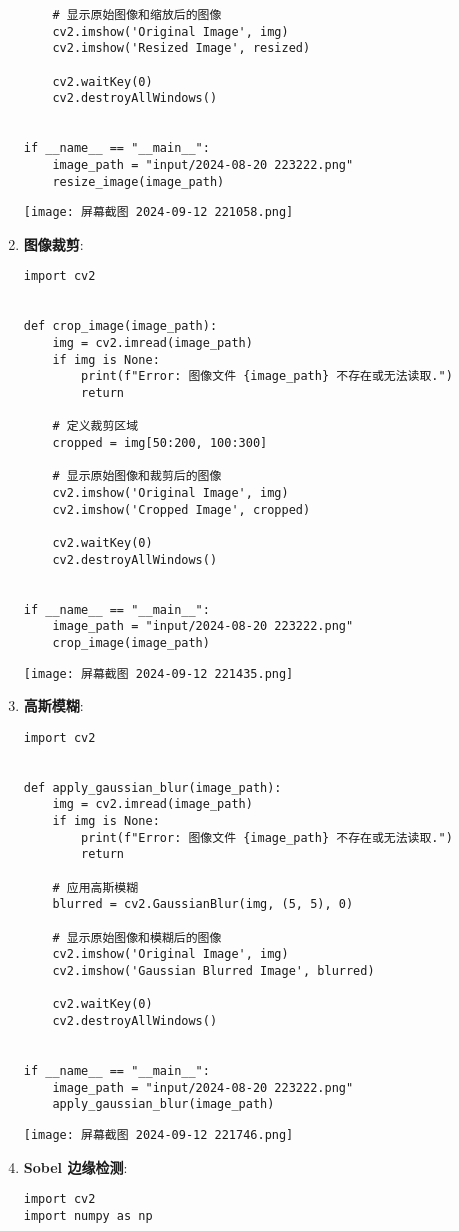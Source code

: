 \documentclass{ctexart}
\begin{document}
\begin{enumerate}[label=\arabic*.]
\begin{lstlisting}
    # 显示原始图像和缩放后的图像
    cv2.imshow('Original Image', img)
    cv2.imshow('Resized Image', resized)

    cv2.waitKey(0)
    cv2.destroyAllWindows()


if __name__ == "__main__":
    image_path = "input/2024-08-20 223222.png"
    resize_image(image_path)
\end{lstlisting}
\texttt{[image: 屏幕截图 2024-09-12 221058.png]}
\item \textbf{图像裁剪}:
\begin{lstlisting}
import cv2


def crop_image(image_path):
    img = cv2.imread(image_path)
    if img is None:
        print(f"Error: 图像文件 {image_path} 不存在或无法读取.")
        return

    # 定义裁剪区域
    cropped = img[50:200, 100:300]

    # 显示原始图像和裁剪后的图像
    cv2.imshow('Original Image', img)
    cv2.imshow('Cropped Image', cropped)

    cv2.waitKey(0)
    cv2.destroyAllWindows()


if __name__ == "__main__":
    image_path = "input/2024-08-20 223222.png"
    crop_image(image_path)
\end{lstlisting}
\texttt{[image: 屏幕截图 2024-09-12 221435.png]}
\item \textbf{高斯模糊}:
\begin{lstlisting}
import cv2


def apply_gaussian_blur(image_path):
    img = cv2.imread(image_path)
    if img is None:
        print(f"Error: 图像文件 {image_path} 不存在或无法读取.")
        return

    # 应用高斯模糊
    blurred = cv2.GaussianBlur(img, (5, 5), 0)

    # 显示原始图像和模糊后的图像
    cv2.imshow('Original Image', img)
    cv2.imshow('Gaussian Blurred Image', blurred)

    cv2.waitKey(0)
    cv2.destroyAllWindows()


if __name__ == "__main__":
    image_path = "input/2024-08-20 223222.png"
    apply_gaussian_blur(image_path)
\end{lstlisting}
\texttt{[image: 屏幕截图 2024-09-12 221746.png]}
\item \textbf{Sobel 边缘检测}:
\begin{lstlisting}
import cv2
import numpy as np



\end{lstlisting}
\end{enumerate}
\end{document}
